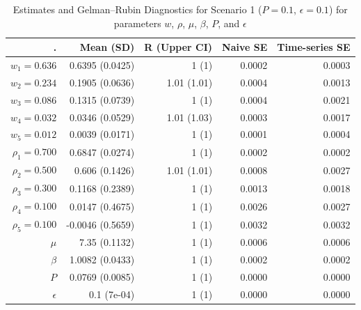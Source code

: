 \documentclass[
  letterpaper,
  double,
  12pt,
  1.0in]{beavtex}
\begin{document}
\begin{table}[ht]
\centering
\begin{tabular}{|r|r|r|r|r|}
  \hline
. & Mean (SD) & R (Upper CI) & Naive SE & Time-series SE \\ 
  \hline
$w_1 = 0.636$ & 0.6395 (0.0425) & 1 (1) & 0.0002 & 0.0003 \\ 
  $w_2 = 0.234$ & 0.1905 (0.0636) & 1.01 (1.01) & 0.0004 & 0.0013 \\ 
  $w_3 = 0.086$ & 0.1315 (0.0739) & 1 (1) & 0.0004 & 0.0021 \\ 
  $w_4 = 0.032$ & 0.0346 (0.0529) & 1.01 (1.03) & 0.0003 & 0.0017 \\ 
  $w_5 = 0.012$ & 0.0039 (0.0171) & 1 (1) & 0.0001 & 0.0004 \\ 
   \hline 
$\rho_1 = 0.700$ & 0.6847 (0.0274) & 1 (1) & 0.0002 & 0.0002 \\ 
  $\rho_2 = 0.500$ & 0.606 (0.1426) & 1.01 (1.01) & 0.0008 & 0.0027 \\ 
  $\rho_3 = 0.300$ & 0.1168 (0.2389) & 1 (1) & 0.0013 & 0.0018 \\ 
  $\rho_4 = 0.100$ & 0.0147 (0.4675) & 1 (1) & 0.0026 & 0.0027 \\ 
  $\rho_5 = 0.100$ & -0.0046 (0.5659) & 1 (1) & 0.0032 & 0.0032 \\ 
   \hline 
$\mu$ & 7.35 (0.1132) & 1 (1) & 0.0006 & 0.0006 \\ 
  $\beta$ & 1.0082 (0.0433) & 1 (1) & 0.0002 & 0.0002 \\ 
  $P$ & 0.0769 (0.0085) & 1 (1) & 0.0000 & 0.0000 \\ 
  $\epsilon$ & 0.1 (7e-04) & 1 (1) & 0.0000 & 0.0000 \\ 
   \hline
\end{tabular}
\caption{Estimates and Gelman--Rubin Diagnostics for Scenario 1 ($P = 0.1$, $\epsilon = 0.1$) for parameters $w$, $\rho$, $\mu$, $\beta$, $P$, and $\epsilon$} 
\end{table}
\end{document}
